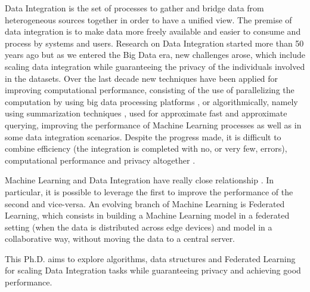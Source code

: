\documentclass[12pt]{article}
\begin{document}
Data Integration is the set of processes to gather and bridge data from heterogeneous sources together in order to 
have a unified view. The premise of data integration is to make data more freely available and easier 
to consume and process by systems and users.
Research on Data Integration started more than 50 years ago \cite*{recordLinkTheory,dataModelIntegration1980} but as we entered the Big Data era, new challenges arose,
 which include scaling \cite*{Dong2013} data integration while guaranteeing the privacy \cite*{yu2016big, Gkoulalas-Divanis2021} of the individuals involved in the datasets.
Over the last decade new techniques have been applied for improving computational performance, consisting of the use of parallelizing the computation by using big data processing platforms \cite*{Dong2013},
 or algorithmically, namely using summarization techniques \cite*{Cormode2011}, used for 
approximate fast and approximate querying, improving the performance of Machine Learning processes \cite*{Gribonval2020, Antonanzas2021, Jiang2018} as well as in some data integration scenarios.
Despite the progress made, it is difficult to combine efficiency (the integration is completed with no, or very few, errors), computational performance and privacy altogether \cite*{He2017}. 


Machine Learning and Data Integration have really close relationship \cite*{Dong2019}. In particular, it is possible to leverage the first to improve the performance of the second
and vice-versa. An evolving branch of Machine Learning is Federated Learning, which consists in building a Machine Learning model in a federated setting (when the data is distributed across
 edge devices) and model in a collaborative way, without moving the data to a central server.

 This Ph.D. aims to explore algorithms, data structures and Federated Learning for scaling Data Integration tasks while guaranteeing privacy and achieving good performance.


\end{document}
